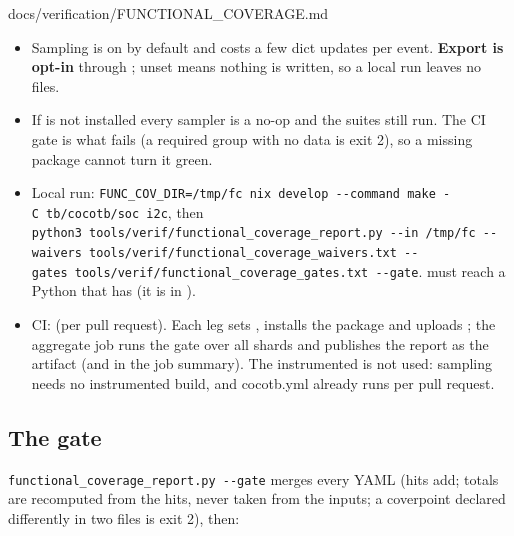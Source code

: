 \begin{relocated}{docs/verification/FUNCTIONAL_COVERAGE.md}
\begin{itemize}
\tightlist
\item
  Sampling is on by default and costs a few dict updates per event.
  \textbf{Export is opt-in} through ; unset means
  nothing is written, so a local run leaves no files.
\item
  If  is not installed every sampler is a no-op
  and the suites still run. The CI gate is what fails (a required group
  with no data is exit 2), so a missing package cannot turn it green.
\item
  Local run:
  \texttt{FUNC\_\allowbreak{}COV\_\allowbreak{}DIR=\allowbreak{}/\allowbreak{}tmp/\allowbreak{}fc\ nix\ develop\ -\allowbreak{}-\allowbreak{}command\ make\ -\allowbreak{}C\ tb/\allowbreak{}cocotb/\allowbreak{}soc\ i2c},
  then
  \texttt{python3\ tools/\allowbreak{}verif/\allowbreak{}functional\_\allowbreak{}coverage\_\allowbreak{}report.\allowbreak{}py\ -\allowbreak{}-\allowbreak{}in\ /\allowbreak{}tmp/\allowbreak{}fc\ -\allowbreak{}-\allowbreak{}waivers\ tools/\allowbreak{}verif/\allowbreak{}functional\_\allowbreak{}coverage\_\allowbreak{}waivers.\allowbreak{}txt\ -\allowbreak{}-\allowbreak{}gates\ tools/\allowbreak{}verif/\allowbreak{}functional\_\allowbreak{}coverage\_\allowbreak{}gates.\allowbreak{}txt\ -\allowbreak{}-\allowbreak{}gate}.
   must reach a Python that has 
  (it is in ).
\item
  CI:  (per pull request). Each  leg
  sets , installs the package and uploads
  ; the  aggregate job runs the gate over
  all shards and publishes the report as the 
  artifact (and in the job summary). The instrumented
   is not used: sampling needs no instrumented
  build, and cocotb.yml already runs per pull request.
\end{itemize}

\subsection{The gate}\label{tm:flow:functional-coverage:3-the-gate}

\texttt{functional\_\allowbreak{}coverage\_\allowbreak{}report.\allowbreak{}py\ -\allowbreak{}-\allowbreak{}gate}
merges every YAML (hits add; totals are recomputed from the hits, never
taken from the inputs; a coverpoint declared differently in two files is
exit 2), then:


\end{relocated}
